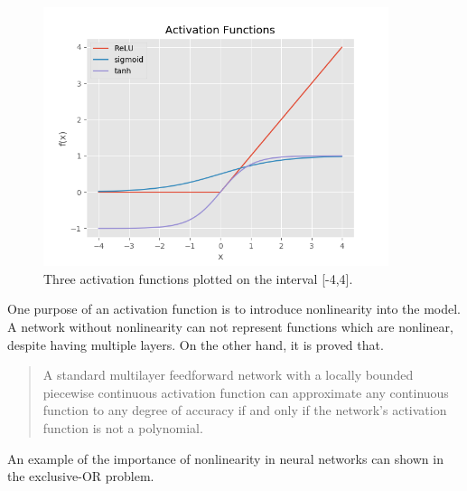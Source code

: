 \begin{figure}[H]
  \centering
    \includegraphics[width=0.9\textwidth]{Assets/Chapter2_Theory/activation_function_overview.png}
    \caption{Three activation functions plotted on the interval [-4,4].}
\end{figure}

One purpose of an activation function is to introduce nonlinearity into the model. A network without nonlinearity can not represent functions which are nonlinear, despite having multiple layers. On the other hand, it is proved that. \cite{leshno1993multilayer}

\begin{quote}
A standard multilayer feedforward network with a locally bounded piecewise
continuous activation function can approximate any continuous function to any degree of
accuracy if and only if the network's activation function is not a polynomial.
\end{quote}
 An example of the importance of nonlinearity in neural networks can shown in the exclusive-OR problem. \parencite{jain_artificial_1996}\cite{sharma_understanding_2018}

